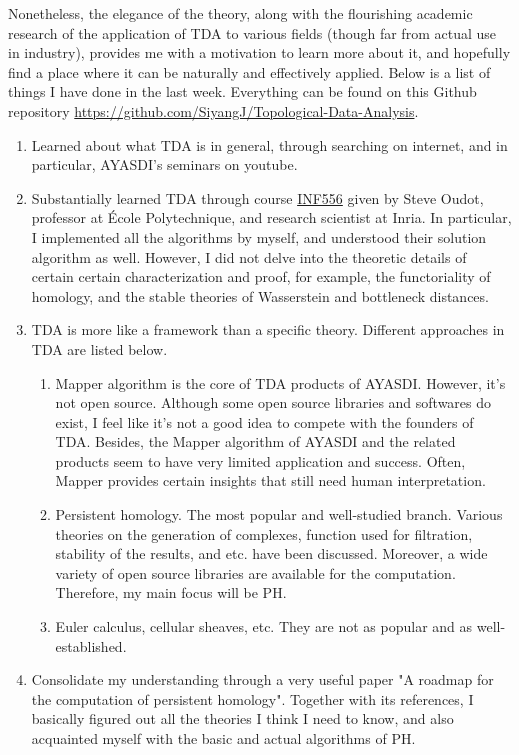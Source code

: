 \documentclass[10pt,a4paper]{article}
\begin{document}
Nonetheless, the elegance of the theory, along with the flourishing academic research of the application of TDA to various fields (though far from actual use in industry), provides me with a motivation to learn more about it, and hopefully find a place where it can be naturally and effectively applied. Below is a list of things I have done in the last week. Everything can be found on this Github repository \url{https://github.com/SiyangJ/Topological-Data-Analysis}.
\begin{enumerate}
	\item Learned about what TDA is in general, through searching on internet, and in particular, AYASDI's seminars on youtube.
	\item Substantially learned TDA through course \href{http://www.enseignement.polytechnique.fr/informatique/INF556/}{INF556} given by Steve Oudot, professor at \'Ecole Polytechnique, and research scientist at Inria. In particular, I implemented all the algorithms by myself, and understood their solution algorithm as well. However, I did not delve into the theoretic details of certain certain characterization and proof, for example, the functoriality of homology, and the stable theories of Wasserstein and bottleneck distances.
	\item TDA is more like a framework than a specific theory. Different approaches in TDA are listed below.
	\begin{enumerate}
		\item Mapper algorithm is the core of TDA products of AYASDI. However, it's not open source. Although some open source libraries and softwares do exist, I feel like it's not a good idea to compete with the founders of TDA. Besides, the Mapper algorithm of AYASDI and the related products seem to have very limited application and success. Often, Mapper provides certain insights that still need human interpretation.
		\item Persistent homology. The most popular and well-studied branch. Various theories on the generation of complexes, function used for filtration, stability of the results, and etc. have been discussed. Moreover, a wide variety of open source libraries are available for the computation. Therefore, my main focus will be PH.
		\item Euler calculus, cellular sheaves, etc. They are not as popular and as well-established.
	\end{enumerate}
	\item Consolidate my understanding through a very useful paper "A roadmap for the computation of persistent homology"\cite{Otter2017}. Together with its references, I basically figured out all the theories I think I need to know, and also acquainted myself with the basic and actual algorithms of PH.

\end{enumerate}
\end{document}

